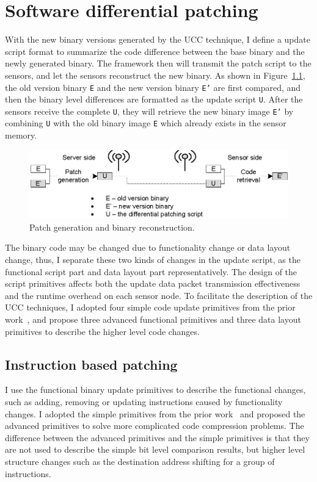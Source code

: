 \chapter{Software differential patching}
With the new binary versions generated by the UCC technique, I define a update script format to summarize the code difference between the base binary and the newly generated binary. The framework then will transmit the patch script to the sensors, and let the sensors reconstruct the new binary. As shown in Figure~\ref{patch}, the old version binary \texttt{E} and the new version binary \texttt{E'} are first compared, and then the binary level differences are formatted as the update script \texttt{U}. After the sensors receive the complete \texttt{U}, they will retrieve the new binary image \texttt{E'} by combining \texttt{U} with the old binary image \texttt{E} which already exists in the sensor memory.

\begin{figure}[htbp]
\centering
\includegraphics[scale=1.2]{figures/patch.eps}
\caption{Patch generation and binary reconstruction.}
\label{patch}
\end{figure}


The binary code may be changed due to functionality change or data layout change, thus, I separate these two kinds of changes in the update script, as the functional script part and data layout part representatively.
The design of the script primitives affects both the update data packet transmission effectiveness and the runtime overhead on each sensor node. To facilitate the description of the UCC techniques, I adopted four simple code update primitives from the prior work~\cite{related:script}, and propose three advanced functional primitives and three data layout primitives to describe the higher level code changes. 

\section {Instruction based patching}

I use the functional binary update primitives to describe the functional changes, such as adding, removing or updating instructions caused by functionality changes. 
I adopted the simple primitives from the prior work~\cite{related:script} and proposed the advanced primitives to solve more complicated code compression problems. The difference between the advanced primitives and the simple primitives is that they are not used to describe the simple bit level comparison results, but higher level structure changes such as the destination address shifting for a group of instructions.

